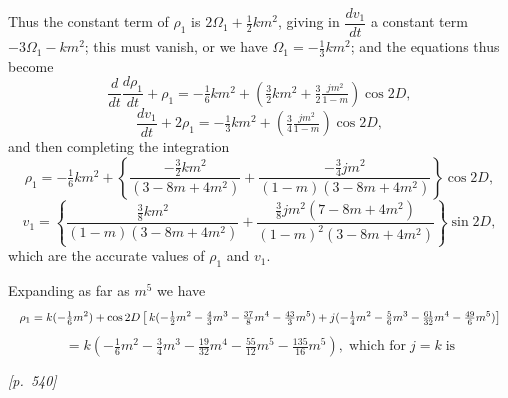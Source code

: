 \documentclass[11pt]{article}
\begin{document}
Thus the constant term of $\rho_1$ is $2\Omega_1+\tfrac{1}{2}km^2$,
giving in $\dfrac{dv_1}{dt}$ a constant term $-3\Omega_1-km^2$; this must
vanish, or we have $\Omega_1=-\tfrac{1}{3}km^2$; and the equations thus
become
\[
\frac{d}{dt}\frac{d\rho_1}{dt}+\rho_1=-\tfrac{1}{6}km^2+\left(\tfrac{3}{2}km^2+\tfrac{3}{2}\tfrac{jm^2}{1-m}\right)\cos 2D,
\]
\[
\frac{dv_1}{dt}+2\rho_1=-\tfrac{1}{3}km^2+\left(\tfrac{3}{4}\tfrac{jm^2}{1-m}\right)\cos 2D,
\]
and then completing the integration
\[
\rho_1=-\tfrac{1}{6}km^2+\left\{\frac{-\tfrac{3}{2}km^2}{(3-8m+4m^2)}+\frac{-\tfrac{3}{4}jm^2}{(1-m)(3-8m+4m^2)}\right\}\cos 2D,
\]
\[
v_1=\left\{\frac{\tfrac{3}{8}km^2}{(1-m)(3-8m+4m^2)}+\frac{\tfrac{3}{8}jm^2(7-8m+4m^2)}{(1-m)^2(3-8m+4m^2)}\right\}\sin 2D,
\]
which are the accurate values of $\rho_1$ and $v_1$.

\medskip

Expanding as far as $m^5$ we have
\[
\resizebox{\textwidth}{!}{$\displaystyle\rho_1=k(-\tfrac{1}{6}m^2)+\cos 2D\,\bigl[\,k(-\tfrac{1}{2}m^2-\tfrac{4}{3}m^3-\tfrac{37}{8}m^4-\tfrac{43}{3}m^5)+j(-\tfrac{1}{4}m^2-\tfrac{5}{6}m^3-\tfrac{61}{32}m^4-\tfrac{49}{6}m^5)\bigr]$}
\]
\[
=k(-\tfrac{1}{6}m^2-\tfrac{3}{4}m^3-\tfrac{19}{32}m^4-\tfrac{55}{12}m^5-\tfrac{135}{16}m^5),\;\text{which for}\;j=k\;\text{is}
\]


\bigskip
\noindent\textit{[p.~540]}

\medskip
\end{document}
